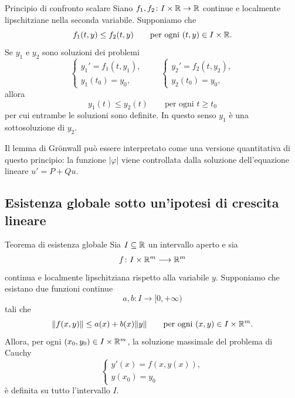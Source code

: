 \documentclass[a4paper]{article}
\begin{document}
\begin{radioactive}
\begin{snippetproposition}{Principio di confronto scalare}
Siano \(f_1,f_2\colon I\times\mathbb{R}\to\mathbb{R}\) continue e localmente lipschitziane nella seconda variabile. Supponiamo che
\[
	f_1(t,y)\leq f_2(t,y)
	\qquad\text{per ogni }(t,y)\in I\times\mathbb{R}.
\]
Se \(y_1\) e \(y_2\) sono soluzioni dei problemi
\[
	\begin{cases}
		y_1'=f_1(t,y_1),\\
		y_1(t_0)=y_0,
	\end{cases}
	\qquad
	\begin{cases}
		y_2'=f_2(t,y_2),\\
		y_2(t_0)=y_0,
	\end{cases}
\]
allora
\[
	y_1(t)\leq y_2(t)
	\qquad\text{per ogni }t\geq t_0
\]
per cui entrambe le soluzioni sono definite. In questo senso \(y_1\) è una sottosoluzione di \(y_2\).
\end{snippetproposition}
\end{radioactive}

\begin{radioactive}
Il lemma di Grönwall può essere interpretato come una versione quantitativa di questo principio: la funzione \(|\varphi|\) viene controllata dalla soluzione dell'equazione lineare \(u'=P+Qu\).
\end{radioactive}

\subsection{Esistenza globale sotto un'ipotesi di crescita lineare}

\begin{radioactive}
\begin{snippettheorem}{Teorema di esistenza globale}
Sia \(I\subseteq\mathbb{R}\) un intervallo aperto e sia
\[
	f\colon I\times\mathbb{R}^m\longrightarrow\mathbb{R}^m
\]
continua e localmente lipschitziana rispetto alla variabile \(y\). Supponiamo che esistano due funzioni continue
\[
	a,b\colon I\longrightarrow[0,+\infty)
\]
tali che
\[
	\lVert f(x,y)\rVert
	\leq a(x)+b(x)\lVert y\rVert
	\qquad\text{per ogni }(x,y)\in I\times\mathbb{R}^m.
\]
Allora, per ogni \((x_0,y_0)\in I\times\mathbb{R}^m\), la soluzione massimale del problema di Cauchy
\[
	\begin{cases}
		y'(x)=f(x,y(x)),\\
		y(x_0)=y_0
	\end{cases}
\]
è definita su tutto l'intervallo \(I\).
\end{snippettheorem}
\end{radioactive}
\end{document}
